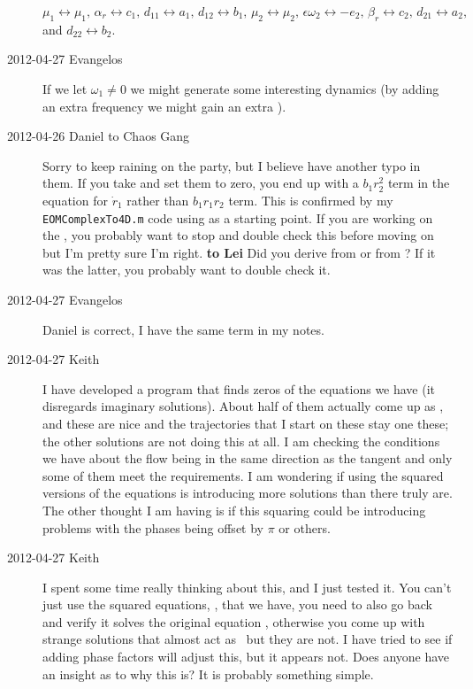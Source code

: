 \begin{description}
 $\mu_1 \leftrightarrow \mu_1,\, \alpha_r \leftrightarrow c_1,\, d_{11} \leftrightarrow a_1,\, d_{12} \leftrightarrow b_1,\, \mu_2 \leftrightarrow \mu_2,\, \epsilon \omega_2 \leftrightarrow -e_2,\, \beta_r \leftrightarrow c_2,\, d_{21} \leftrightarrow a_2,$ and  $d_{22} \leftrightarrow b_2$.

\item[2012-04-27 Evangelos] If we let $\omega_1\neq0$ we might generate
some interesting dynamics (by adding an extra frequency we might gain an
extra \reqv).

\item[2012-04-26 Daniel to Chaos Gang] Sorry to keep raining on the
party, but I believe  have another typo in
them. If you take  and set them to zero, you end
up with a $b_1 r_2^2$ term in the equation for $\dot{r}_1$ rather than
$b_1 r_1 r_2$ term. This is confirmed by my \texttt{EOMComplexTo4D.m}
code using  as a starting point. If you are
working on the {\twoMode} \reqva, you probably want to stop and
double check this before moving on but I'm pretty sure I'm right. {\bf to
Lei} Did you derive  from 
or from ? If it was the latter, you probably
want to double check it.

\item[2012-04-27 Evangelos] Daniel is correct, I have the same term in my notes.

\item[2012-04-27 Keith]  I have developed a program that finds zeros of
the equations we have (it disregards imaginary solutions).  About half of
them actually come up as \reqva, and these are nice and
the trajectories that I start on these stay one these; the other
solutions are not doing this at all.  I am checking the conditions we
have about the flow being in the same direction as the tangent and only
some of them meet the requirements.  I am wondering if using the squared
versions of the equations is introducing more solutions than there truly
are.  The other thought I am having is if this squaring could be
introducing problems with the phases being offset by $\pi$ or others.


\item[2012-04-27 Keith]  I spent some time really thinking about this,
and I just tested it.  You can't just use the squared equations,
, that we have, you need to also go back and verify
it solves the original equation , otherwise you
come up with strange solutions that almost act as \reqva\
but they are not.  I have tried to see if adding phase factors will
adjust this, but it appears not.  Does anyone have an insight as to why
this is?  It is probably something simple.


\end{description}
